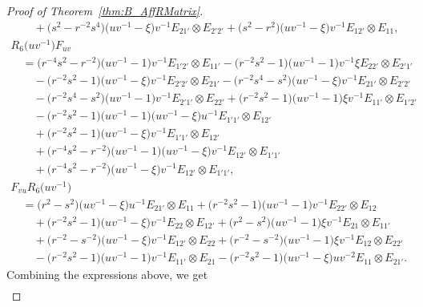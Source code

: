 \documentclass[10pt,a4paper]{amsart}
\numberwithin{equation}{section}
\begin{document}
\begin{proof}[Proof of Theorem~\ref{thm:B_AffRMatrix}]
\begin{gather*}
 \qquad{}+ \bigl(s^{2} - r^{-2}s^{4}\bigr)\bigl(uv^{-1} - \xi\bigr)v^{-1}E_{21'} \otimes E_{2'2'}+\bigl(s^{2} - r^{2}\bigr)\bigl(uv^{-1} - \xi\bigr)v^{-1}E_{12'} \otimes E_{11},
\\
 R_{6}\bigl(uv^{-1}\bigr)F_{uv} \\
 \quad{}= \bigl(r^{-4}s^{2} - r^{-2}\bigr)\bigl(uv^{-1} - 1\bigr)v^{-1}E_{1'2'} \otimes E_{11'} - \bigl(r^{-2}s^{2} - 1\bigr)\bigl(uv^{-1} - 1\bigr)v^{-1}\xi E_{22'} \otimes E_{2'1'} \\
 \qquad{}-\bigl(r^{-2}s^{2} - 1\bigr)\bigl(uv^{-1} - \xi\bigr)v^{-1}E_{2'2'} \otimes E_{21'} - \bigl(r^{-2}s^{4} - s^{2}\bigr)\bigl(uv^{-1} - \xi\bigr)v^{-1}E_{21'} \otimes E_{2'2'} \\
 \qquad{}-\bigl(r^{-2}s^{4} - s^{2}\bigr)\bigl(uv^{-1} - 1\bigr)v^{-1}E_{2'1'} \otimes E_{22'} + \bigl(r^{-2}s^{2} - 1\bigr)\bigl(uv^{-1} - 1\bigr)\xi v^{-1}E_{11'} \otimes E_{1'2'} \\
 \qquad{}-\bigl(r^{-2}s^{2} - 1\bigr)\bigl(uv^{-1} - 1\bigr)\bigl(uv^{-1} - \xi\bigr)u^{-1}E_{1'1'} \otimes E_{12'}\\
 \qquad{} + \bigl(r^{-2}s^{2} - 1\bigr)\bigl(uv^{-1} - \xi\bigr)v^{-1}E_{1'1'} \otimes E_{12'} \\
 \qquad{} +\bigl(r^{-4}s^{2} - r^{-2}\bigr)\bigl(uv^{-1} - 1\bigr)\bigl(uv^{-1} - \xi\bigr)v^{-1}E_{12'} \otimes E_{1'1'} \\
 \qquad{} + \bigl(r^{-4}s^{2} - r^{-2}\bigr)\bigl(uv^{-1} - \xi\bigr)v^{-1}E_{12'} \otimes E_{1'1'},
\\
 F_{vu}R_{6}\bigl(uv^{-1}\bigr) \\
 \quad{}= \bigl(r^{2} - s^{2}\bigr)\bigl(uv^{-1} - \xi\bigr)u^{-1}E_{21'} \otimes E_{11} + \bigl(r^{-2}s^{2} - 1\bigr)\bigl(uv^{-1} - 1\bigr)v^{-1}E_{22'} \otimes E_{12}\\
 \qquad{} +\bigl(r^{-2}s^{2} - 1\bigr)\bigl(uv^{-1} - \xi\bigr)v^{-1}E_{22} \otimes E_{12'} + \bigl(r^{2} - s^{2}\bigr)\bigl(uv^{-1} - 1\bigr)\xi v^{-1}E_{21} \otimes E_{11'} \\
 \qquad{}+\bigl(r^{-2} - s^{-2}\bigr)\bigl(uv^{-1} - \xi\bigr)v^{-1}E_{12'} \otimes E_{22} + \bigl(r^{-2} - s^{-2}\bigr)\bigl(uv^{-1} - 1\bigr)\xi v^{-1}E_{12} \otimes E_{22'} \\
 \qquad{}-\bigl(r^{-2}s^{2} - 1\bigr)\bigl(uv^{-1} - 1\bigr)v^{-1}E_{11'} \otimes E_{21} - \bigl(r^{-2}s^{2} - 1\bigr)\bigl(uv^{-1} - \xi\bigr)uv^{-2}E_{11} \otimes E_{21'}.
\end{gather*}
Combining the expressions above, we get
\begin{gather}

\end{gather}
\end{proof}
\end{document}
